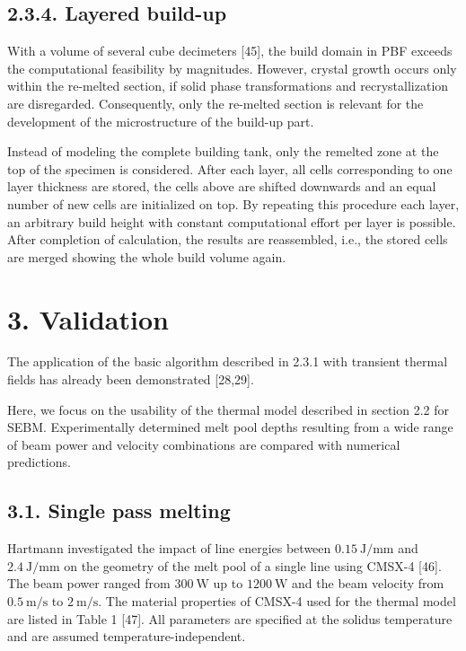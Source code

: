 \documentclass[10pt]{article}
\begin{document}
\subsection*{2.3.4. Layered build-up}
With a volume of several cube decimeters [45], the build domain in PBF exceeds the computational feasibility by magnitudes. However, crystal growth occurs only within the re-melted section, if solid phase transformations and recrystallization are disregarded. Consequently, only the re-melted section is relevant for the development of the microstructure of the build-up part.

Instead of modeling the complete building tank, only the remelted zone at the top of the specimen is considered. After each layer, all cells corresponding to one layer thickness are stored, the cells above are shifted downwards and an equal number of new cells are initialized on top. By repeating this procedure each layer, an arbitrary build height with constant computational effort per layer is possible. After completion of calculation, the results are reassembled, i.e., the stored cells are merged showing the whole build volume again.

\section*{3. Validation}
The application of the basic algorithm described in 2.3.1 with transient thermal fields has already been demonstrated [28,29].

Here, we focus on the usability of the thermal model described in section 2.2 for SEBM. Experimentally determined melt pool depths resulting from a wide range of beam power and velocity combinations are compared with numerical predictions.

\subsection*{3.1. Single pass melting}
Hartmann investigated the impact of line energies between $0.15 \mathrm{~J} / \mathrm{mm}$ and $2.4 \mathrm{~J} / \mathrm{mm}$ on the geometry of the melt pool of a single line using CMSX-4 [46]. The beam power ranged from $300 \mathrm{~W}$ up to $1200 \mathrm{~W}$ and the beam velocity from $0.5 \mathrm{~m} / \mathrm{s}$ to $2 \mathrm{~m} / \mathrm{s}$. The material properties of CMSX-4 used for the thermal model are listed in Table 1 [47]. All parameters are specified at the solidus temperature and are assumed temperature-independent.
\end{document}
